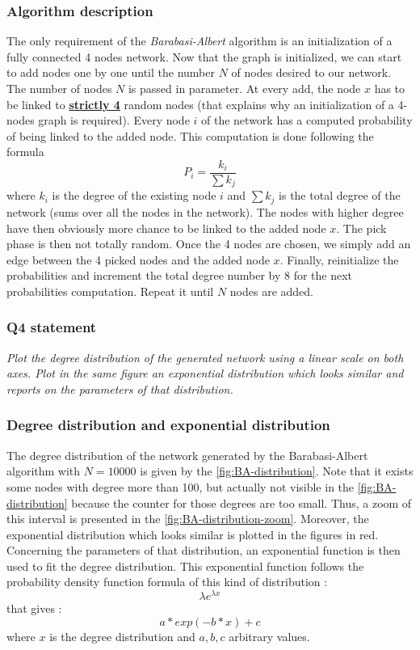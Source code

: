 \documentclass{article}
\begin{document}
\subsubsection*{Algorithm description}
The only requirement of the \textit{Barabasi-Albert} algorithm is an initialization of a fully connected 4 nodes network. Now that the graph is initialized, we can start to add nodes one by one until the number $N$ of nodes desired to our network. The number of nodes  $N$ is passed in parameter. At every add, the node $x$ has to be linked to \textbf{\underline{strictly 4}} random nodes (that explains why an initialization of a 4-nodes graph is required). Every node $i$ of the network has a computed probability of being linked to the added node. This computation is done following the formula $$ P_{i} = \frac{k_{i}}{\sum k_{j}} $$ where $k_{i}$ is the degree of the existing node $i$ and $ \sum k_{j}$ is the total degree of the network (sums over all the nodes in the network). The nodes with higher degree have then obviously more chance to be linked to the added node $x$. The pick phase is then not totally random.  Once the 4 nodes are chosen, we simply add an edge between the 4 picked nodes and the added node $x$. Finally, reinitialize the probabilities and increment the total degree number by 8 for the next probabilities computation. Repeat it until $N$ nodes are added. 


\subsubsection{Q4 statement}
\textit{Plot the degree distribution of the generated network using a linear scale on both axes. Plot in the same figure an exponential distribution which looks similar and reports on the parameters of that distribution.}

\subsubsection*{Degree distribution and exponential distribution} 
The degree distribution of the network generated by the Barabasi-Albert algorithm with $N = 10000$ is given by the \autoref{fig:BA-distribution}. Note that it exists some nodes with degree more than 100, but actually not visible in the \autoref{fig:BA-distribution} because the counter for those degrees are too small. Thus, a zoom of this interval is presented in the \autoref{fig:BA-distribution-zoom}. Moreover, the exponential distribution which looks similar is plotted in the figures in red. Concerning the parameters of that distribution, an exponential function is then used to fit the degree distribution. This exponential function follows the probability density function formula of this kind of distribution : $$\lambda e^{\lambda x}$$ that gives : $$a*exp(-b*x)+c$$ where $x$ is the degree distribution and $a,b,c$ arbitrary values.   
\end{document}
